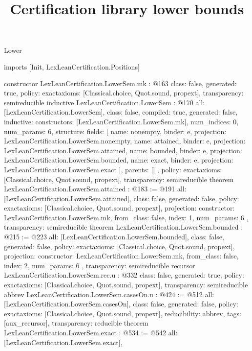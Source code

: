 \begin{lexlean}{Lower}
\title{Certification library lower bounds}
\begin{coremodule}
imports [Init, LexLeanCertification.Positions]

constructor LexLeanCertification.LowerSem.mk : @163 {
  class: false,
  generated: true,
  policy: exact{axioms: [Classical.choice, Quot.sound, propext]},
  transparency: semireducible
}
inductive LexLeanCertification.LowerSem : @170 {
  all: [LexLeanCertification.LowerSem],
  class: false,
  compiled: true,
  generated: false,
  inductive: {
    constructors: [LexLeanCertification.LowerSem.mk],
    num_indices: 0,
    num_params: 6,
    structure: {
      fields: [
        {name: nonempty, binder: e, projection: LexLeanCertification.LowerSem.nonempty},
        {name: attained, binder: e, projection: LexLeanCertification.LowerSem.attained},
        {name: bounded, binder: e, projection: LexLeanCertification.LowerSem.bounded},
        {name: exact, binder: e, projection: LexLeanCertification.LowerSem.exact}
      ],
      parents: []
    }
  },
  policy: exact{axioms: [Classical.choice, Quot.sound, propext]},
  transparency: semireducible
}
theorem LexLeanCertification.LowerSem.attained : @183 := @191 {
  all: [LexLeanCertification.LowerSem.attained],
  class: false,
  generated: false,
  policy: exact{axioms: [Classical.choice, Quot.sound, propext]},
  projection: {
    constructor: LexLeanCertification.LowerSem.mk,
    from_class: false,
    index: 1,
    num_params: 6
  },
  transparency: semireducible
}
theorem LexLeanCertification.LowerSem.bounded : @215 := @223 {
  all: [LexLeanCertification.LowerSem.bounded],
  class: false,
  generated: false,
  policy: exact{axioms: [Classical.choice, Quot.sound, propext]},
  projection: {
    constructor: LexLeanCertification.LowerSem.mk,
    from_class: false,
    index: 2,
    num_params: 6
  },
  transparency: semireducible
}
recursor LexLeanCertification.LowerSem.rec.{u} : @332 {
  class: false,
  generated: true,
  policy: exact{axioms: [Classical.choice, Quot.sound, propext]},
  transparency: semireducible
}
abbrev LexLeanCertification.LowerSem.casesOn.{u} : @424 := @512 {
  all: [LexLeanCertification.LowerSem.casesOn],
  class: false,
  generated: false,
  policy: exact{axioms: [Classical.choice, Quot.sound, propext]},
  reducibility: abbrev{},
  tags: [aux_recursor],
  transparency: reducible
}
theorem LexLeanCertification.LowerSem.exact : @534 := @542 {
  all: [LexLeanCertification.LowerSem.exact],
}
\end{coremodule}
\end{lexlean}
